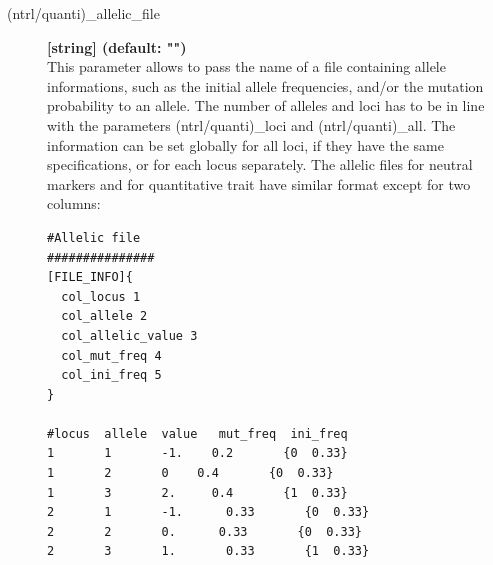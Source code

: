 \documentclass[letterpaper,12pt,oneside]{book}
\begin{document}
\begin{description}
\item[\label{allelicFile}(ntrl/quanti)\_allelic\_file]  \textbf{[string] (default: "")} \\
This parameter allows to pass the name of a file containing allele informations, such as the initial allele frequencies, and/or the mutation probability to an allele. The number of alleles and loci has to be in line with the parameters \textsf{(ntrl/quanti)\_loci} and \textsf{(ntrl/quanti)\_all}. The information can be set globally for all loci, if they have the same specifications, or for each locus separately. The allelic files for neutral markers and for quantitative trait have similar format except for two columns:

\begin{lstlisting}[frame=single]
#Allelic file 
###############
[FILE_INFO]{
  col_locus 1
  col_allele 2
  col_allelic_value 3
  col_mut_freq 4
  col_ini_freq 5
}

#locus  allele  value   mut_freq  ini_freq  
1       1       -1.    0.2       {0  0.33}
1       2       0    0.4       {0  0.33}
1       3       2.     0.4       {1  0.33}
2       1       -1.      0.33       {0  0.33}
2       2       0.      0.33       {0  0.33}
2       3       1.       0.33       {1  0.33}
\end{lstlisting}


\end{description}
\end{document}
